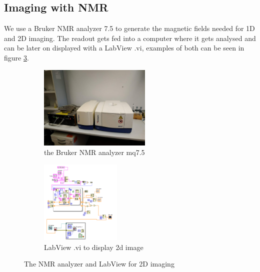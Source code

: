\subsection{Imaging with NMR}\label{lay2}
We use a Bruker NMR analyzer 7.5 to generate the magnetic fields needed for 1D and 2D imaging. The readout gets fed into a computer where it gets analysed and can be later on displayed with a LabView .vi, examples of both can be seen in figure \ref{ImgLay}.
\begin{figure}[h!]
	\begin{subfigure}{0.5\textwidth}
	\includegraphics[width=0.9\linewidth ,height=4cm]{images/minispec_mq7_5.jpg}
	\caption{the Bruker NMR analyzer mq7.5}
	\label{Img1}
	\end{subfigure}
	\begin{subfigure}{0.5\textwidth}
	\includegraphics[width=0.5\linewidth ,height=4cm]{images/displaying_2d_image_labview_block.png}
	\caption{LabView .vi to display 2d image}
	\label{Img2}
	\end{subfigure}
	\caption{The NMR analyzer and LabView for 2D imaging}
	\label{ImgLay}
\end{figure}\\